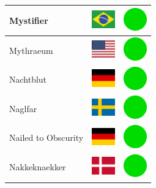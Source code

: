 \documentclass[12pt, a4paper, twoside]{report}
\begin{document}
\begin{center}
\begin{longtable}{|p{5cm}|p{2cm}|p{2cm}|}
 Mystifier                                                  & \includegraphics[width=1cm]{../img/flags/br} &   \includegraphics[width=1cm]{../likes/y} \\ \hline
 Mythraeum                                                  & \includegraphics[width=1cm]{../img/flags/us} &   \includegraphics[width=1cm]{../likes/y} \\ \hline
 Nachtblut                                                  & \includegraphics[width=1cm]{../img/flags/de} &   \includegraphics[width=1cm]{../likes/y} \\ \hline
 Naglfar                                                    & \includegraphics[width=1cm]{../img/flags/se} &   \includegraphics[width=1cm]{../likes/y} \\ \hline
 Nailed to Obscurity                                        & \includegraphics[width=1cm]{../img/flags/de} &   \includegraphics[width=1cm]{../likes/y} \\ \hline
 Nakkeknaekker                                              & \includegraphics[width=1cm]{../img/flags/dk} &   \includegraphics[width=1cm]{../likes/y} \\ \hline

\end{longtable}
\end{center}
\end{document}
